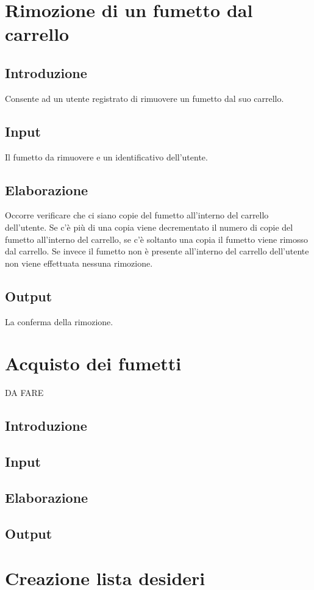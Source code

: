 \documentclass{scrreprt}
\begin{document}
\section{Rimozione di un fumetto dal carrello}

\subsection*{Introduzione}
Consente ad un utente registrato di rimuovere un fumetto dal suo carrello.
\subsection*{Input}
Il fumetto da rimuovere e un identificativo dell'utente.
\subsection*{Elaborazione}
Occorre verificare che ci siano copie del fumetto all'interno del carrello dell'utente.
Se c'è più di una copia viene decrementato il numero di copie del fumetto all'interno del carrello,
se c'è soltanto una copia il fumetto viene rimosso dal carrello. Se invece il fumetto non è presente
all'interno del carrello dell'utente non viene effettuata nessuna rimozione.
\subsection*{Output}
La conferma della rimozione.

\section{Acquisto dei fumetti}
DA FARE
\subsection*{Introduzione}
\subsection*{Input}
\subsection*{Elaborazione}
\subsection*{Output}

\section{Creazione lista desideri}
\end{document}
